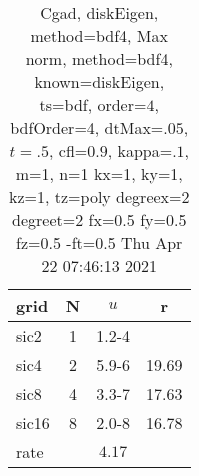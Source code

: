 \begin{table}[H]\tableFont %
\begin{center}
\begin{tabular}{|l|c|c|c|} \hline 
grid  & N &  $ u $ & r \\ \hline 
      sic2 &     1 & \num{1.2}{-4} &        \\ \hline
      sic4 &     2 & \num{5.9}{-6} & 19.69  \\ \hline
      sic8 &     4 & \num{3.3}{-7} & 17.63  \\ \hline
     sic16 &     8 & \num{2.0}{-8} & 16.78  \\ \hline
    rate             &       &  $4.17$       &       \\ \hline
\end{tabular}
\caption{Cgad, diskEigen, method=bdf4, Max norm, method=bdf4, known=diskEigen, ts=bdf, order=$4$, bdfOrder=4, dtMax=$.05$, $t=.5$, cfl=$0.9$, kappa=$.1$, m=1, n=1 kx=1, ky=1, kz=1,  tz=poly degreex=2 degreet=2 fx=0.5 fy=0.5 fz=0.5 -ft=0.5 Thu Apr 22 07:46:13 2021}\label{table:diskEigenbdf4Order4Max}
\end{center}
\end{table}
